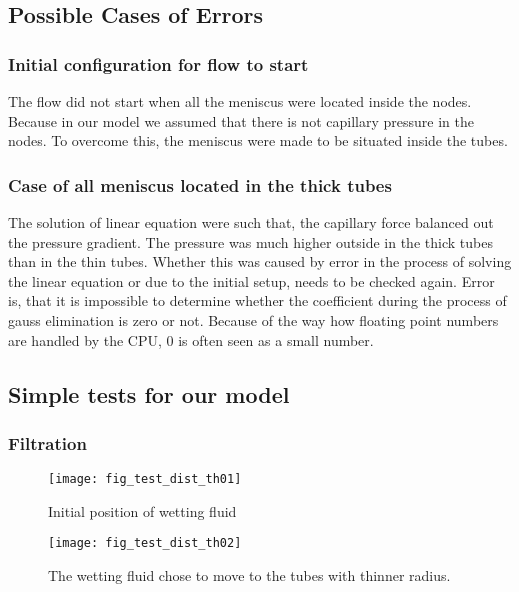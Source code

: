 \subsection{Possible Cases of Errors}

	\subsubsection{Initial configuration for flow to start}

	The flow did not start when all the meniscus were located inside the nodes. Because in our model we assumed that there is not capillary pressure in the nodes. To overcome this, the meniscus were made to be situated inside the tubes.

	\subsubsection{Case of all meniscus located in the thick tubes}

	The solution of linear equation were such that, the capillary force balanced out the pressure gradient. The pressure was much higher outside in the thick tubes than in the thin tubes. Whether this was caused by error in the process of solving the linear equation or due to the initial setup, needs to be checked again. Error is, that it is impossible to determine whether the coefficient during the process of gauss elimination is zero or not. Because of the way how floating point numbers are handled by the CPU, 0 is often seen as a small number.

\subsection{Simple tests for our model}
	\subsubsection{Filtration}
		\begin{figure}[H]
			\centering
			\texttt{[image: fig\_test\_dist\_th01]}
			\caption{Initial position of wetting fluid}
		\end{figure}

		\begin{figure}[H]
			\centering
			\texttt{[image: fig\_test\_dist\_th02]}
			\caption{The wetting fluid chose to move to the tubes with thinner radius.}
			
		\end{figure}
		
